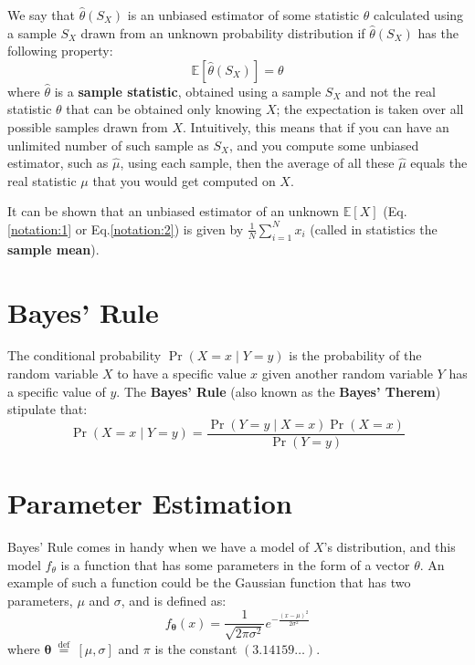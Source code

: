 We say that \(\hat{\theta}\left(S_{X}\right)\) is an unbiased estimator of some statistic \(\theta\) calculated using a sample \(S_{X}\)
drawn from an unknown probability distribution if \(\hat{\theta}\left(S_{X}\right)\) has the following property:
$$
	\mathbb{E}\left[\hat{\theta}\left(S_{X}\right)\right]=\theta
$$
where \(\hat{\theta}\) is a \textbf{sample statistic}, obtained using a sample \(S_{X}\) and not the real statistic \(\theta\) that can be obtained only knowing \(X\); the expectation is taken over all possible samples drawn from \(X\). Intuitively, this means that if you can have an unlimited number of such sample as \(S_{X}\), and you compute some unbiased estimator, such as \(\hat{\mu}\), using each sample, then the average of all these \(\hat{\mu}\) equals the real statistic \(\mu\) that you would get computed on \(X\).

It can be shown that an unbiased estimator of an unknown \(\mathbb{E}[X]\) (Eq.\ref{notation:1} or Eq.\ref{notation:2}) is given by \(\frac{1}{N} \sum_{i=1}^{N} x_{i}\) (called in statistics the \textbf{sample mean}).

\section{Bayes' Rule}
The conditional probability \(\operatorname{Pr}(X=x \mid Y=y)\) is the probability of the random variable \(X\) to have a specific value $x$ given another random variable $Y$ has a specific value of $y$. The \textbf{Bayes' Rule} (also known as the \textbf{Bayes' Therem}) stipulate that:
$$
	\operatorname{Pr}(X=x \mid Y=y)=\frac{\operatorname{Pr}(Y=y \mid X=x) \operatorname{Pr}(X=x)}{\operatorname{Pr}(Y=y)}
$$

\section{Parameter Estimation}
Bayes' Rule comes in handy when we have a model of \(X\)'s distribution, and this model \(f_{\theta}\) is a function that has some parameters in the form of a vector \(\theta\).  An example of such a function could be the Gaussian function that has two parameters, $\mu$ and $\sigma$, and is defined as:
\begin{equation}
	f_{\boldsymbol{\theta}}(x)=\frac{1}{\sqrt{2 \pi \sigma^{2}}} e^{-\frac{(x-\mu)^{2}}{2 \sigma^{2}}}
	\label{notation:3}
\end{equation}
where \(\boldsymbol{\theta} \stackrel{\text { def }}{=}[\mu, \sigma]\) and \(\pi\) is the constant \((3.14159 \ldots)\).


